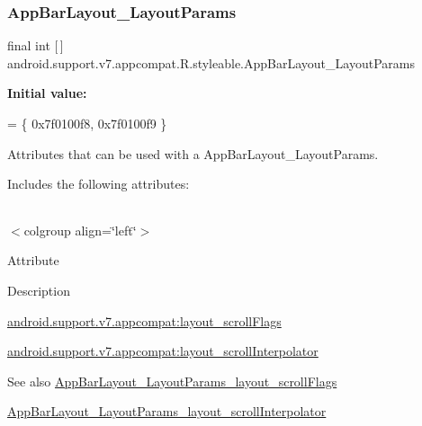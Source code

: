 \subsubsection{\texorpdfstring{App\+Bar\+Layout\+\_\+\+Layout\+Params}{AppBarLayout\_LayoutParams}}
{\footnotesize\ttfamily final int \mbox{[}$\,$\mbox{]} android.\+support.\+v7.\+appcompat.\+R.\+styleable.\+App\+Bar\+Layout\+\_\+\+Layout\+Params\hspace{0.3cm}{\ttfamily [static]}}

{\bfseries Initial value\+:}
\begin{DoxyCode}
= \{
            0x7f0100f8, 0x7f0100f9
        \}
\end{DoxyCode}
Attributes that can be used with a App\+Bar\+Layout\+\_\+\+Layout\+Params. 

Includes the following attributes\+:

\tabulinesep=1mm
\begin{longtabu} spread 0pt [c]{*{0}{|X[-1]}|}
\hline
\end{longtabu}
$<$colgroup align=\char`\"{}left\char`\"{}$>$ 

Attribute

Description 

{\ttfamily \hyperlink{classandroid_1_1support_1_1v7_1_1appcompat_1_1R_1_1styleable_a9e60ed5c50f4ab57039c8d0c6faf455e}{android.\+support.\+v7.\+appcompat\+:layout\+\_\+scroll\+Flags}}

{\ttfamily \hyperlink{classandroid_1_1support_1_1v7_1_1appcompat_1_1R_1_1styleable_a9f970a38797d2ee751b09ca5b920ecbe}{android.\+support.\+v7.\+appcompat\+:layout\+\_\+scroll\+Interpolator}}

\begin{DoxySeeAlso}{See also}
\hyperlink{classandroid_1_1support_1_1v7_1_1appcompat_1_1R_1_1styleable_a9e60ed5c50f4ab57039c8d0c6faf455e}{App\+Bar\+Layout\+\_\+\+Layout\+Params\+\_\+layout\+\_\+scroll\+Flags} 

\hyperlink{classandroid_1_1support_1_1v7_1_1appcompat_1_1R_1_1styleable_a9f970a38797d2ee751b09ca5b920ecbe}{App\+Bar\+Layout\+\_\+\+Layout\+Params\+\_\+layout\+\_\+scroll\+Interpolator} 
\end{DoxySeeAlso}
\mbox{\label{classandroid_1_1support_1_1v7_1_1appcompat_1_1R_1_1styleable_a9e60ed5c50f4ab57039c8d0c6faf455e}} 
